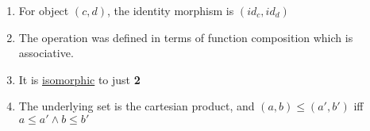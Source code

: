 \begin{enumerate}
    \item For object $(c,d)$, the identity morphism is $(id_c,id_d)$
    \item The operation was defined in terms of function composition which is associative.
    \item It is \href{doc/1 math/Seven Sketches in Compositionality/Chapter 3: Databases/2 Categories/5 Isomorphisms in a category/1 Isomorphism}{isomorphic} to just \textbf{2}
    \item The underlying set is the cartesian product, and $(a,b)\leq(a',b')$ iff $a \leq a' \land b \leq b'$
  \end{enumerate}
